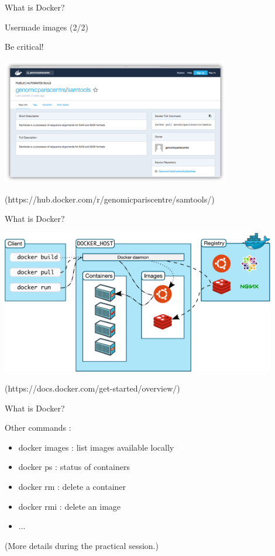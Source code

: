 \begin{frame}{What is Docker?}

Usermade images (2/2)

Be critical!

\centering\includegraphics[width=10cm]{02_encapsulation/images/docker_dockerhub_gpc_samtools.png}

(https://hub.docker.com/r/genomicpariscentre/samtools/)
\end{frame}

\begin{frame}{What is Docker?}

\centering\includegraphics[width=12cm]{02_encapsulation/images/docker_architecture.pdf}

(https://docs.docker.com/get-started/overview/)
\end{frame}

\begin{frame}{What is Docker?}

Other commands :

\begin{itemize}
  \item docker images : list images available locally
  \item docker ps : status of containers
  \item docker rm : delete a container
  \item docker rmi : delete an image
  \item ...
\end{itemize}

(More details during the practical session.)

\end{frame}

